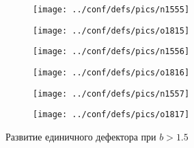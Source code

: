 \documentclass[12pt,a4paper]{article}
\begin{document}
\begin{figure}
	\ContinuedFloat
		\begin{subfigure}{.5\textwidth}
		\caption{}
		\label{fig:n1351}
		\texttt{[image: ../conf/defs/pics/n1555]}
	\end{subfigure}%
	\begin{subfigure}{.5\textwidth}
		\caption{}
		\label{fig:n1351}
		\texttt{[image: ../conf/defs/pics/o1815]}
	\end{subfigure}%
	
	
	\begin{subfigure}{.5\textwidth}
		\caption{}
		\label{fig:n1351}
		\texttt{[image: ../conf/defs/pics/n1556]}
	\end{subfigure}%
	\begin{subfigure}{.5\textwidth}
		\caption{}
		\label{fig:n1351}
		\texttt{[image: ../conf/defs/pics/o1816]}
	\end{subfigure}%

	\begin{subfigure}{.5\textwidth}
		\caption{}
		\label{fig:n1351}
		\texttt{[image: ../conf/defs/pics/n1557]}
	\end{subfigure}%
	\begin{subfigure}{.5\textwidth}
		\caption{}
		\label{fig:n1351}
		\texttt{[image: ../conf/defs/pics/o1817]}
	\end{subfigure}%

	\caption{Развитие единичного дефектора при $b>1.5$}
\end{figure}
\end{document}
